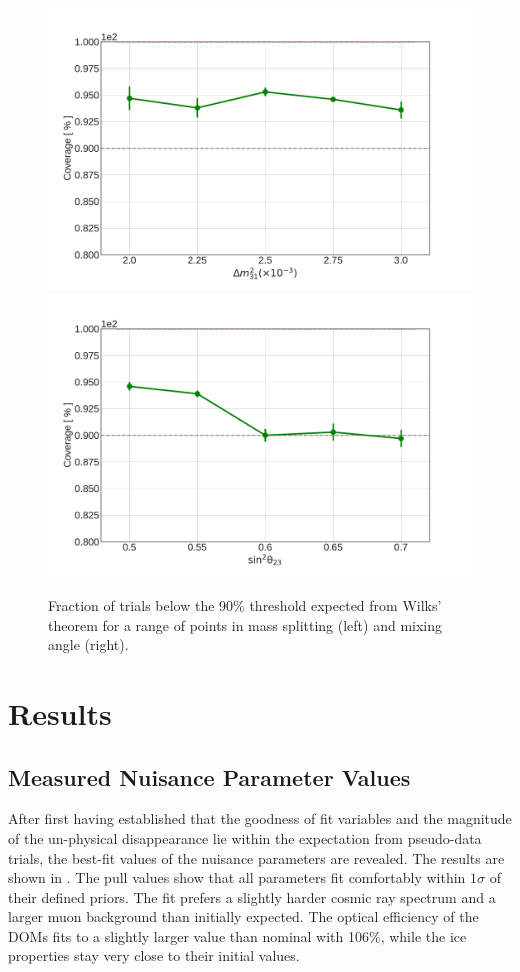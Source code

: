 \begin{figure}
    \centering
    \includegraphics[width=0.45\linewidth]{figures/measurement/three_flavor/coverage_test/coverage_dm_v3.pdf}
    \includegraphics[width=0.45\linewidth]{figures/measurement/three_flavor/coverage_test/coverage_t23_v3.pdf}
    \caption{Fraction of trials below the 90\% threshold expected from Wilks' theorem for a range of points in mass splitting (left) and mixing angle (right).}
    \label{fig:three-flavor-coverage}
\end{figure}

\section{Results}


\subsection{Measured Nuisance Parameter Values}
After first having established that the goodness of fit variables and the magnitude of the un-physical disappearance lie within the expectation from pseudo-data trials, the best-fit values of the nuisance parameters are revealed. The results are shown in . The pull values show that all parameters fit comfortably within $1\sigma$ of their defined priors. The fit prefers a slightly harder cosmic ray spectrum and a larger muon background than initially expected. The optical efficiency of the DOMs fits to a slightly larger value than nominal with 106\%, while the ice properties stay very close to their initial values.


